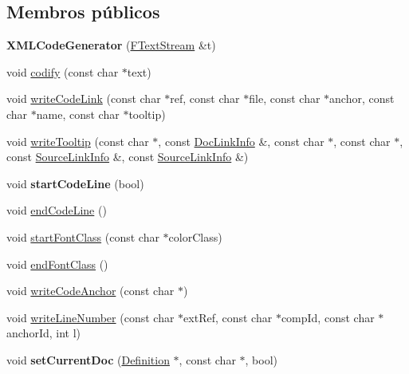 \subsection*{Membros públicos}
\begin{DoxyCompactItemize}
\item 
\hypertarget{class_x_m_l_code_generator_aaac026f706f8ad4a179802c47d6334d6}{{\bfseries X\-M\-L\-Code\-Generator} (\hyperlink{class_f_text_stream}{F\-Text\-Stream} \&t)}\label{class_x_m_l_code_generator_aaac026f706f8ad4a179802c47d6334d6}

\item 
void \hyperlink{class_x_m_l_code_generator_a96b26b0cb63719fd5370a9a04d2ebb38}{codify} (const char $\ast$text)
\item 
void \hyperlink{class_x_m_l_code_generator_ab3866da052a840c400b4990dd2ddf61b}{write\-Code\-Link} (const char $\ast$ref, const char $\ast$file, const char $\ast$anchor, const char $\ast$name, const char $\ast$tooltip)
\item 
void \hyperlink{class_x_m_l_code_generator_a7ff5de02f14ba4c6b98edcaa3483e386}{write\-Tooltip} (const char $\ast$, const \hyperlink{struct_doc_link_info}{Doc\-Link\-Info} \&, const char $\ast$, const char $\ast$, const \hyperlink{struct_source_link_info}{Source\-Link\-Info} \&, const \hyperlink{struct_source_link_info}{Source\-Link\-Info} \&)
\item 
\hypertarget{class_x_m_l_code_generator_aa76dc2000bd743981f13bb8953b51499}{void {\bfseries start\-Code\-Line} (bool)}\label{class_x_m_l_code_generator_aa76dc2000bd743981f13bb8953b51499}

\item 
void \hyperlink{class_x_m_l_code_generator_adbe51a89cf6f9573b3434e7cfda81a7c}{end\-Code\-Line} ()
\item 
void \hyperlink{class_x_m_l_code_generator_a915a74cafbcb208a8d399fbf12d73769}{start\-Font\-Class} (const char $\ast$color\-Class)
\item 
void \hyperlink{class_x_m_l_code_generator_ab7851025d80a6d1ed6dd8e25016136e1}{end\-Font\-Class} ()
\item 
void \hyperlink{class_x_m_l_code_generator_a688757a1dcb8c6bef1202433a36083a7}{write\-Code\-Anchor} (const char $\ast$)
\item 
void \hyperlink{class_x_m_l_code_generator_a0a50ef78e830a1b1949dd97491c29c01}{write\-Line\-Number} (const char $\ast$ext\-Ref, const char $\ast$comp\-Id, const char $\ast$anchor\-Id, int l)
\item 
\hypertarget{class_x_m_l_code_generator_a71a2ac1fad218c1ccb067138cdfaae22}{void {\bfseries set\-Current\-Doc} (\hyperlink{class_definition}{Definition} $\ast$, const char $\ast$, bool)}\label{class_x_m_l_code_generator_a71a2ac1fad218c1ccb067138cdfaae22}


\end{DoxyCompactItemize}
